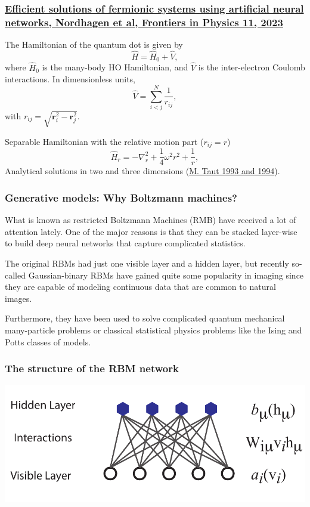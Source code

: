\documentclass{beamer}
\begin{document}
\begin{frame}
\frametitle{\href{{https://doi.org/10.3389/fphy.2023.1061580}}{Efficient solutions of fermionic systems using artificial neural networks, Nordhagen et al, Frontiers in Physics 11, 2023}}

The Hamiltonian of the quantum dot is given by
\[ \hat{H} = \hat{H}_0 + \hat{V}, 
\]
where $\hat{H}_0$ is the many-body HO Hamiltonian, and $\hat{V}$ is the
inter-electron Coulomb interactions. In dimensionless units,
\[ \hat{V}= \sum_{i < j}^N \frac{1}{r_{ij}},
\]
with $r_{ij}=\sqrt{\mathbf{r}_i^2 - \mathbf{r}_j^2}$.

Separable Hamiltonian with the relative motion part ($r_{ij}=r$)
\[ 
\hat{H}_r=-\nabla^2_r + \frac{1}{4}\omega^2r^2+ \frac{1}{r},
\]
Analytical solutions in two and three dimensions (\href{{https://journals.aps.org/pra/abstract/10.1103/PhysRevA.48.3561}}{M. Taut 1993 and 1994}).
\end{frame}

\begin{frame}
\frametitle{Generative models: Why Boltzmann machines?}

What is known as restricted Boltzmann Machines (RMB) have received a
lot of attention lately.  One of the major reasons is that they can be
stacked layer-wise to build deep neural networks that capture
complicated statistics.

The original RBMs had just one visible layer and a hidden layer, but
recently so-called Gaussian-binary RBMs have gained quite some
popularity in imaging since they are capable of modeling continuous
data that are common to natural images.

Furthermore, they have been used to solve complicated quantum
mechanical many-particle problems or classical statistical physics
problems like the Ising and Potts classes of models.
\end{frame}

\begin{frame}
\frametitle{The structure of the RBM network}

\vspace{6mm}

\centerline{\includegraphics[width=1.0\linewidth]{figures/RBM.pdf}}

\vspace{6mm}
\end{frame}
\end{document}
